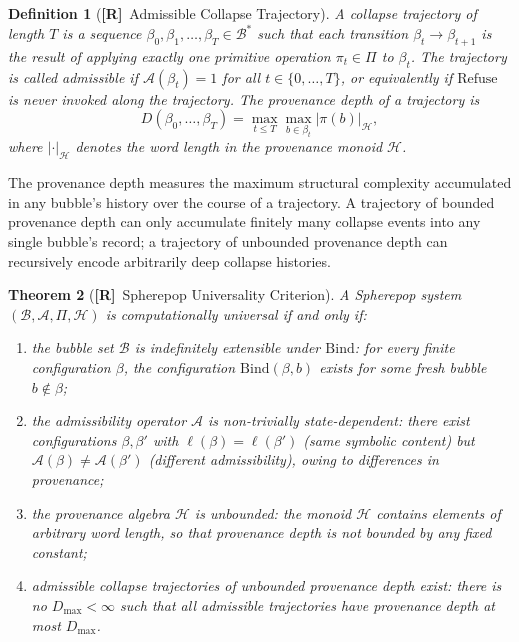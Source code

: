 \documentclass[11pt, oneside]{article}
\numberwithin{equation}{section}
\newcommand{\ClaimR}{\textcolor{rsvpblue}{\textbf{[R]}}}
\theoremstyle{rsvpstyle}
\newtheorem{theorem}{Theorem}[section]
\newtheorem{definition}[theorem]{Definition}
\theoremstyle{remark}
\begin{document}
\begin{definition}[\ClaimR\ Admissible Collapse Trajectory]
\label{def:collapse-traj}
A \emph{collapse trajectory} of length $T$ is a sequence
$\beta_0, \beta_1, \ldots, \beta_T \in \mathcal{B}^*$ such that each transition
$\beta_t \to \beta_{t+1}$ is the result of applying exactly one primitive operation
$\pi_t \in \Pi$ to $\beta_t$. The trajectory is called \emph{admissible} if
$\mathcal{A}(\beta_t) = 1$ for all $t \in \{0, \ldots, T\}$, or equivalently if
$\mathrm{Refuse}$ is never invoked along the trajectory. The \emph{provenance depth}
of a trajectory is
\begin{equation}
  D(\beta_0, \ldots, \beta_T) = \max_{t \leq T} \max_{b \in \beta_t} |\pi(b)|_\mathcal{H},
\end{equation}
where $|\cdot|_\mathcal{H}$ denotes the word length in the provenance monoid $\mathcal{H}$.
\end{definition}

The provenance depth measures the maximum structural complexity accumulated in any
bubble's history over the course of a trajectory. A trajectory of bounded provenance
depth can only accumulate finitely many collapse events into any single bubble's
record; a trajectory of unbounded provenance depth can recursively encode arbitrarily
deep collapse histories.

\begin{theorem}[\ClaimR\ Spherepop Universality Criterion]
\label{thm:spherepop-universal}
A Spherepop system $(\mathcal{B}, \mathcal{A}, \Pi, \mathcal{H})$ is computationally
universal if and only if:
\begin{enumerate}[label=(\roman*)]
  \item the bubble set $\mathcal{B}$ is indefinitely extensible under $\mathrm{Bind}$:
    for every finite configuration $\beta$, the configuration $\mathrm{Bind}(\beta, b)$
    exists for some fresh bubble $b \notin \beta$;
  \item the admissibility operator $\mathcal{A}$ is non-trivially state-dependent:
    there exist configurations $\beta, \beta'$ with $\ell(\beta) = \ell(\beta')$
    (same symbolic content) but $\mathcal{A}(\beta) \neq \mathcal{A}(\beta')$
    (different admissibility), owing to differences in provenance;
  \item the provenance algebra $\mathcal{H}$ is unbounded: the monoid $\mathcal{H}$
    contains elements of arbitrary word length, so that provenance depth is not
    bounded by any fixed constant;
  \item admissible collapse trajectories of unbounded provenance depth exist: there
    is no $D_{\max} < \infty$ such that all admissible trajectories have provenance
    depth at most $D_{\max}$.
\end{enumerate}
\end{theorem}
\end{document}
